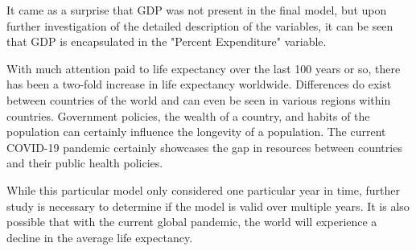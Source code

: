 It came as a surprise that GDP was not present in the final model, but upon further investigation of the detailed description of the variables, it can be seen that GDP is encapsulated in the "Percent Expenditure" variable. 

With much attention paid to life expectancy over the last 100 years or so, there has been a two-fold increase in life expectancy worldwide. Differences do exist between countries of the world and can even be seen in various regions within countries. Government policies, the wealth of a country, and habits of the population can certainly influence the longevity of a population. The current COVID-19 pandemic certainly showcases the gap in resources between countries and their public health policies. 

While this particular model only considered one particular year in time, further study is necessary to determine if the model is valid over multiple years. It is also possible that with the current global pandemic, the world will experience a decline in the average life expectancy.





